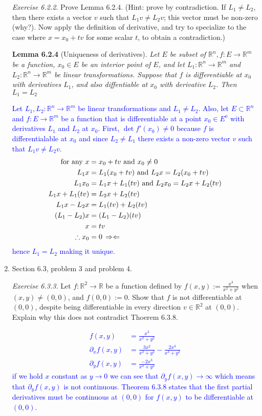 \documentclass[10pt,a4paper]{report}
\newcommand{\BLUE}[1]{\textcolor{blue}{#1}}
\begin{document}
\begin{enumerate}[label=\Roman*.]
	\textit{Exercise 6.2.2}.  Prove Lemma 6.2.4. (Hint: prove by contradiction.  If $L_1 \ne L_2$, then there exists a vector $v$ such that $L_1v \ne L_2v$; this vector must be non-zero (why?).  Now apply the definition of derivative, and try to specialize to the case where $x=x_0+tv$ for some scalar $t$, to obtain a contradiction.)

\newcommand{\RRR}{\mathbb{R}}	
	\textbf{Lemma 6.2.4} (Uniqueness of derivatives).  \textit{Let $E$ be  subset of $\RRR^n, f: E\to \RRR^m$ be a function, $x_0\in E$ be an interior point of $E$, and let $L_1: \RRR^n\to \RRR^m$ and $L_2: \RRR^n\to \RRR^m$ be linear transformations.  Suppose that $f$ is differentiable at $x_0$ with derivatives $L_1$, and also diffentiable at $x_0$ with derivative $L_2$.  Then $L_1=L_2$}
\newcommand{\NORM}[1]{\left \lVert\, #1\, \right \lVert}	

	\BLUE{Let $L_1, L_2: \RRR^n \to \RRR^m$ be linear transformations and $L_1 \ne L_2$.  Also, let $E \subset \RRR^n$ and $f: E \to \RRR^m$ be a function that is differentiable at a point $x_0 \in E^o$ with derivatives $L_1$ and $L_2$ at $x_0$.  First, $\det f'(x_0) \ne 0$ because $f$ is differentialable at $x_0$ and since $L_2 \ne L_1$ there exists a non-zero vector $v$ such that $L_1 v \ne L_2 v$.
	\begin{align*}
		\text{for any } x &= x_0+tv \text{ and } x_0 \ne 0\\
		L_1x &= L_1(x_0+tv) \text{ and } L_2x = L_2(x_0+tv) \\
		L_1x_0 &= L_1x+L_1(tv) \text{ and } L_2x_0 = L_2x+L_2(tv) \\
		L_1x+L_1(tv) &= L_2x+L_2(tv) \\
		L_1x-L_2x &= L_1(tv)+L_2(tv) \\
		(L_1-L_2)x &= (L_1-L_2)(tv) \\
		x &= tv \\
		\therefore x_0 &= 0 \, \Rightarrow\Leftarrow
	\end{align*}hence $L_1 = L_2$ making it unique.
	}
	
	\newpage
	\item Section 6.3, problem 3 and problem 4.
	
	\textit{Exercise 6.3.3.}  Let $f: \RRR^2 \to \RRR$ be a function defined by $f(x,y) := \frac{x^3}{x^2+y^2}$ when $(x,y) \ne (0,0)$, and $f(0,0) := 0$.  Show that $f$ is not differentiable at $(0,0)$, despite being differentiable in every direction $v \in \RRR^2$ at $(0,0)$. Explain why this does not contradict Thoerem 6.3.8.
	
	\BLUE{\begin{align*}
		f(x,y) &= \frac{x^3}{x^2+y^2} \\
		\partial_x f(x,y) &= \frac{3x^2}{x^2+y^2}  -\frac{2x^3}{x^3+y^2}\\
		\partial_y f(x,y) &= \frac{-2x^3}{x^2+y^2} 
	\end{align*}if we hold $x$ constant as $y \to 0$ we can see that $\partial_y f(x,y) \to \infty$ which means that $\partial_y f(x,y)$ is not continuous.  Theorem 6.3.8 states that the first partial derivatives must be continuous at $(0,0)$ for $f(x,y)$ to be differentiable at $(0,0)$.\\
	}
	

\end{enumerate}
\end{document}
